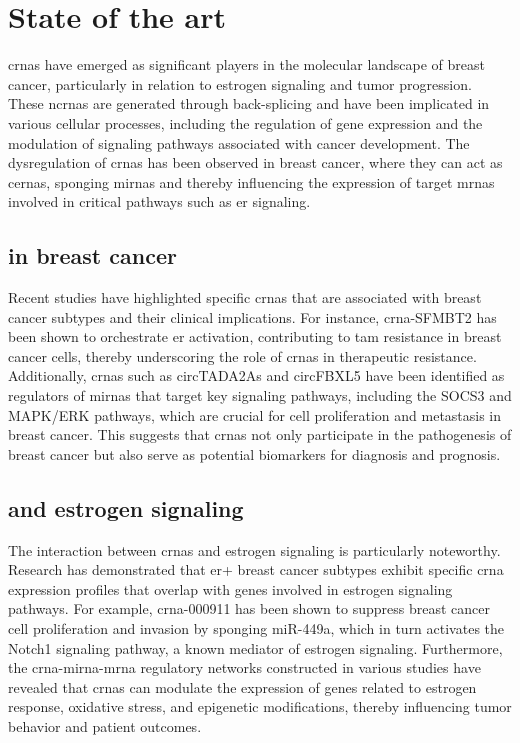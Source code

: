 \section{State of the art}
\Glspl{crna} have emerged as significant players in the
molecular landscape of breast cancer, particularly in relation to estrogen
signaling and tumor progression.
These \glspl{ncrna} are generated through back-splicing and have been
implicated in various cellular processes, including the regulation of gene
expression and the modulation of signaling pathways associated with cancer
development\supercite{li_circrna-sfmbt2_2023,tran_new_2020}.
The dysregulation of \glspl{crna} has been observed in breast cancer, where
they can act as \glspl{cerna}, sponging \glspl{mirna} and thereby influencing
the expression of target \glspl{mrna} involved in critical pathways such as
\gls{er} signaling\supercite{nair_circular_2016,xu_circrna_2022}.

\subsection{ in breast cancer}
Recent studies have highlighted specific \glspl{crna} that are associated with
breast cancer subtypes and their clinical implications.
For instance, \gls{crna}-SFMBT2 has been shown to orchestrate
\gls{er}\textalpha{} activation, contributing to \gls{tam} resistance in breast
cancer cells, thereby underscoring the role of \glspl{crna} in therapeutic
resistance\supercite{li_circrna-sfmbt2_2023}.
Additionally, \glspl{crna} such as circTADA2As and circFBXL5 have been
identified as regulators of \glspl{mirna} that target key signaling pathways,
including the SOCS3 and MAPK/ERK pathways, which are crucial for cell
proliferation and metastasis in breast
cancer\supercite{xu_circtada2as_2019,gao_hsa_circrna_0006528_2019}.
This suggests that \glspl{crna} not only participate in the pathogenesis of
breast cancer but also serve as potential biomarkers for diagnosis and
prognosis\supercite{liu_influence_2021,chen_circepsti1_2018}.

\subsection{ and estrogen signaling}
The interaction between \glspl{crna} and estrogen signaling is particularly
noteworthy.
Research has demonstrated that \gls{er+} breast cancer subtypes exhibit
specific \gls{crna} expression profiles that overlap with genes involved in
estrogen signaling pathways\supercite{nair_circular_2016}.
For example, \gls{crna}-000911 has been shown to suppress breast cancer cell
proliferation and invasion by sponging miR-449a, which in turn activates the
Notch1 signaling pathway, a known mediator of estrogen
signaling\supercite{wang_comprehensive_2018}.
Furthermore, the \gls{crna}-\gls{mirna}-\gls{mrna} regulatory networks
constructed in various studies have revealed that \glspl{crna} can modulate the
expression of genes related to estrogen response, oxidative stress, and
epigenetic modifications, thereby influencing tumor behavior and patient
outcomes\supercite{xu_circrna_2022,nair_circular_2016}.
